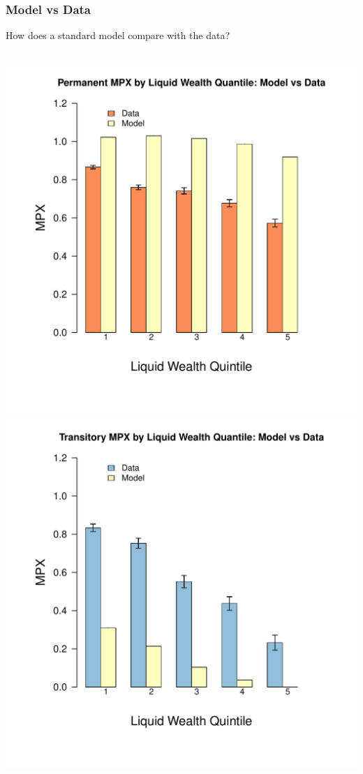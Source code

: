\documentclass{beamer}
\begin{document}
\frame
{
	\frametitle{Model vs Data}
	How does a standard model compare with the data?
	\begin{columns}
		\centering
		\includegraphics[scale=0.35]{../Figures/CSTW_perm_denmark.pdf}
		\centering
		\includegraphics[scale=0.35]{../Figures/CSTW_tran_denmark.pdf}
	\end{columns} 
}
\end{document}
